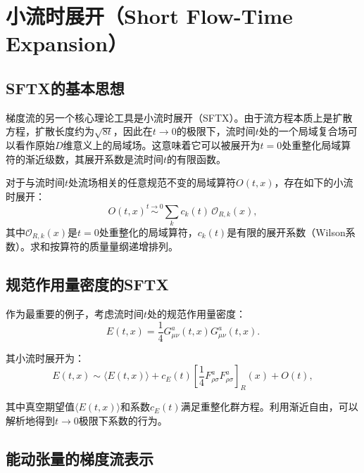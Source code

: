 \documentclass[12pt,a4paper]{ctexart}
\theoremstyle{definition}
\begin{document}
\section{小流时展开（Short Flow-Time Expansion）}\label{sec:sftx}

\subsection{SFTX的基本思想}

梯度流的另一个核心理论工具是小流时展开（SFTX）\cite{Luscher2014,Suzuki2013}。由于流方程本质上是扩散方程，扩散长度约为$\sqrt{8t}$，因此在$t \to 0$的极限下，流时间$t$处的一个局域复合场可以看作原始$D$维意义上的局域场。这意味着它可以被展开为$t=0$处重整化局域算符的渐近级数，其展开系数是流时间$t$的有限函数。

对于与流时间$t$处流场相关的任意规范不变的局域算符$O(t,x)$，存在如下的小流时展开\cite{Luscher2014,Suzuki2013}：
\begin{equation}
O(t,x) \overset{t \to 0}{\sim} \sum_k c_k(t) \, \mathcal{O}_{R,k}(x),
\label{eq:sftx_general}
\end{equation}
其中$\mathcal{O}_{R,k}(x)$是$t=0$处重整化的局域算符，$c_k(t)$是有限的展开系数（Wilson系数）。求和按算符的质量量纲递增排列。

\subsection{规范作用量密度的SFTX}

作为最重要的例子，考虑流时间$t$处的规范作用量密度\cite{Suzuki2013}：
\begin{equation}
E(t,x) = \frac{1}{4} G_{\mu\nu}^a(t,x) G_{\mu\nu}^a(t,x).
\label{eq:Et_def}
\end{equation}

其小流时展开为：
\begin{equation}
E(t,x) \sim \langle E(t,x) \rangle + c_E(t) \left[ \frac{1}{4} F_{\rho\sigma}^a F_{\rho\sigma}^a \right]_R(x) + O(t),
\label{eq:sftx_E}
\end{equation}

其中真空期望值$\langle E(t,x) \rangle$和系数$c_E(t)$满足重整化群方程。利用渐近自由，可以解析地得到$t \to 0$极限下系数的行为\cite{Suzuki2013}。

\subsection{能动张量的梯度流表示}
\end{document}
